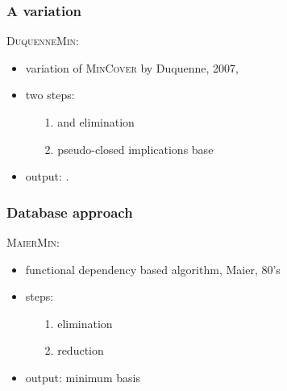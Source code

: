 \begin{frame}
\frametitle{A variation}

\textsc{DuquenneMin}:
\begin{itemize}
	\item variation of \textsc{MinCover} by Duquenne, 2007,
	\item two steps:
		\begin{itemize}
			\item[\color{belize} 1.]  and  elimination
			\item[ ] 
			\item[ ] 
			
			\vspace{0.5em}
			
			\item[\color{belize} 2.]  pseudo-closed implications base
			\item[ ] 
		\end{itemize}
	
	\item output: .
	
\end{itemize}
\end{frame}

\begin{frame}
\frametitle{Database approach}

\textsc{MaierMin}:
\begin{itemize}
	\item functional dependency based algorithm, Maier, 80's
	
	\item steps:
		\begin{itemize}
			\item[\color{belize} 1.]  elimination
			\item[ ] 
			
			\vspace{0.5em}
			
			\item[\color{belize} 2.]  reduction
			\item[ ] 
			\item[ ] 
		\end{itemize}

	\item output: minimum basis
\end{itemize}

\end{frame}


